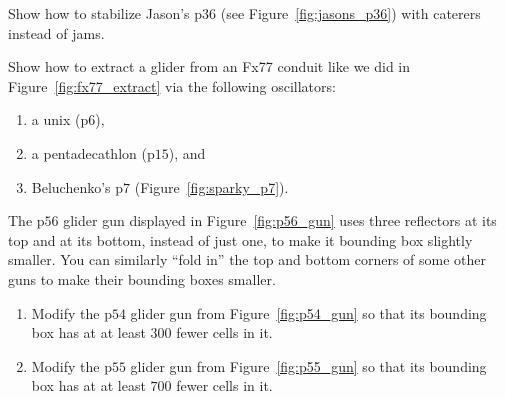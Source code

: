 \begin{multicols}{2}
	
	\mfilbreak
	
	
	\begin{problem}\label{exer:jasons_p36_caterer}
		Show how to stabilize Jason's p$36$ (see Figure~\ref{fig:jasons_p36}) with caterers instead of jams.
	\end{problem}
	
	
	\mfilbreak
	
	
	\begin{problem}\label{exer:fx77_extract_other_osc}
		Show how to extract a glider from an Fx77 conduit like we did in Figure~\ref{fig:fx77_extract} via the following oscillators:
		
		\begin{enumerate}[label=\bf\color{ocre}(\alph*)]
			\item a unix (p$6$),
			
			\item a pentadecathlon (p$15$), and
			
			\item Beluchenko's p$7$ (Figure~\ref{fig:sparky_p7}).
		\end{enumerate}
	\end{problem}
	
	
	\mfilbreak
	
	
	\begin{problem}\label{exer:p54_fold_corners}
		The p$56$ glider gun displayed in Figure~\ref{fig:p56_gun} uses three reflectors at its top and at its bottom, instead of just one, to make it bounding box slightly smaller. You can similarly ``fold in'' the top and bottom corners of some other guns to make their bounding boxes smaller.
		
		\begin{enumerate}[label=\bf\color{ocre}(\alph*)]
			\item Modify the p$54$ glider gun from Figure~\ref{fig:p54_gun} so that its bounding box has at at least $300$ fewer cells in it.
			
			\item Modify the p$55$ glider gun from Figure~\ref{fig:p55_gun} so that its bounding box has at at least $700$ fewer cells in it.
		\end{enumerate}
	\end{problem}
	

\end{multicols}
